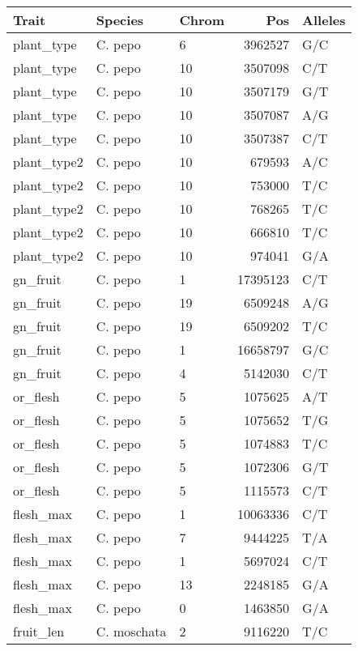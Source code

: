 \begin{table}[ht]
\centering
\begin{tabular}{lllrl}
  \hline
{\bfseries Trait} & {\bfseries Species} & {\bfseries Chrom} & {\bfseries Pos} & {\bfseries Alleles} \\ 
  \hline
plant\_type & C. pepo & 6 & 3962527 & G/C \\ 
  plant\_type & C. pepo & 10 & 3507098 & C/T \\ 
  plant\_type & C. pepo & 10 & 3507179 & G/T \\ 
  plant\_type & C. pepo & 10 & 3507087 & A/G \\ 
  plant\_type & C. pepo & 10 & 3507387 & C/T \\ 
  plant\_type2 & C. pepo & 10 & 679593 & A/C \\ 
  plant\_type2 & C. pepo & 10 & 753000 & T/C \\ 
  plant\_type2 & C. pepo & 10 & 768265 & T/C \\ 
  plant\_type2 & C. pepo & 10 & 666810 & T/C \\ 
  plant\_type2 & C. pepo & 10 & 974041 & G/A \\ 
  gn\_fruit & C. pepo & 1 & 17395123 & C/T \\ 
  gn\_fruit & C. pepo & 19 & 6509248 & A/G \\ 
  gn\_fruit & C. pepo & 19 & 6509202 & T/C \\ 
  gn\_fruit & C. pepo & 1 & 16658797 & G/C \\ 
  gn\_fruit & C. pepo & 4 & 5142030 & C/T \\ 
  or\_flesh & C. pepo & 5 & 1075625 & A/T \\ 
  or\_flesh & C. pepo & 5 & 1075652 & T/G \\ 
  or\_flesh & C. pepo & 5 & 1074883 & T/C \\ 
  or\_flesh & C. pepo & 5 & 1072306 & G/T \\ 
  or\_flesh & C. pepo & 5 & 1115573 & C/T \\ 
  flesh\_max & C. pepo & 1 & 10063336 & C/T \\ 
  flesh\_max & C. pepo & 7 & 9444225 & T/A \\ 
  flesh\_max & C. pepo & 1 & 5697024 & C/T \\ 
  flesh\_max & C. pepo & 13 & 2248185 & G/A \\ 
  flesh\_max & C. pepo & 0 & 1463850 & G/A \\ 
  fruit\_len & C. moschata & 2 & 9116220 & T/C \\ 

\end{tabular}
\end{table}
